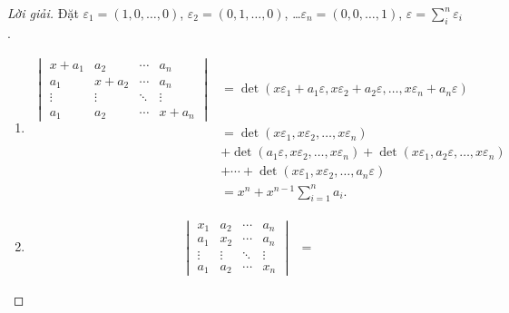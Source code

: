 \documentclass[class=linearalgebra,crop=false]{standalone}
\begin{document}
\begin{proof}[Lời giải]
    \par Đặt $\varepsilon_{1} = (1, 0, \ldots, 0)$, $\varepsilon_{2} = (0, 1, \ldots, 0)$, \ldots $\varepsilon_{n} = (0, 0, \ldots, 1)$, $\varepsilon = \displaystyle\sum^{n}_{i}\varepsilon_{i}$.
    \begin{enumerate}[label = (\alph*)]
        \item
              \begin{align*}
                  \begin{vmatrix}
                      x + a_{1} & a_{2}     & \cdots & a_{n}     \\
                      a_{1}     & x + a_{2} & \cdots & a_{n}     \\
                      \vdots    & \vdots    & \ddots & \vdots    \\
                      a_{1}     & a_{2}     & \cdots & x + a_{n}
                  \end{vmatrix}
                   & = \det(x\varepsilon_{1} + a_{1}\varepsilon, x\varepsilon_{2} + a_{2}\varepsilon, \ldots, x\varepsilon_{n} + a_{n}\varepsilon)             \\
                   & = \det(x\varepsilon_{1}, x\varepsilon_{2}, \ldots, x\varepsilon_{n})                                                                      \\
                   & + \det(a_{1}\varepsilon, x\varepsilon_{2}, \ldots, x\varepsilon_{n}) + \det(x\varepsilon_{1}, a_{2}\varepsilon, \ldots, x\varepsilon_{n}) \\
                   & + \cdots + \det(x\varepsilon_{1}, x\varepsilon_{2}, \ldots, a_{n}\varepsilon)                                                             \\
                   & = x^{n} + x^{n-1}\sum^{n}_{i=1}a_{i}.
              \end{align*}
        \item
              \begin{align*}
                  \begin{vmatrix}
                      x_{1}  & a_{2}  & \cdots & a_{n}  \\
                      a_{1}  & x_{2}  & \cdots & a_{n}  \\
                      \vdots & \vdots & \ddots & \vdots \\
                      a_{1}  & a_{2}  & \cdots & x_{n}
                  \end{vmatrix}
                   & =

\end{align*}
\end{enumerate}
\end{proof}
\end{document}
